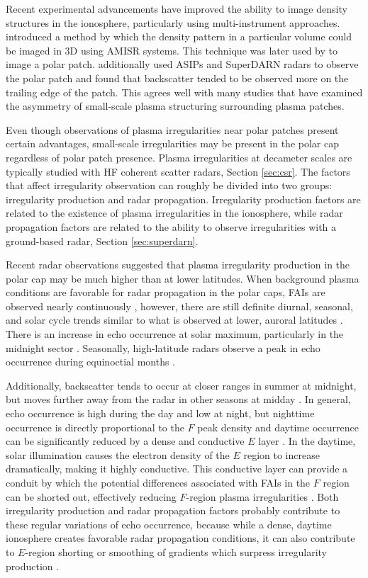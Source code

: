 Recent experimental advancements have improved the ability to image density structures in the ionosphere, particularly using multi-instrument approaches.  \citet{Semeter2009} introduced a method by which the density pattern in a particular volume could be imaged in 3D using AMISR systems.  This technique was later used by \citet{Dahlgren2012a,Dahlgren2012b} to image a polar patch.  \citet{Dahlgren2012b} additionally used ASIPs and SuperDARN radars to observe the polar patch and found that backscatter tended to be observed more on the trailing edge of the patch.  This agrees well with many studies that have examined the asymmetry of small-scale plasma structuring surrounding plasma patches.  

Even though observations of plasma irregularities near polar patches present certain advantages, small-scale irregularities may be present in the polar cap regardless of polar patch presence.  Plasma irregularities at decameter scales are typically studied with HF coherent scatter radars, Section \ref{sec:csr}.  The factors that affect irregularity observation can roughly be divided into two groups: irregularity production and radar propagation.  Irregularity production factors are related to the existence of plasma irregularities in the ionosphere, while radar propagation factors are related to the ability to observe irregularities with a ground-based radar, Section \ref{sec:superdarn}.  

Recent radar observations suggested that plasma irregularity production in the polar cap may be much higher than at lower latitudes.  When background plasma conditions are favorable for radar propagation in the polar caps, FAIs are observed nearly continuously \citep{Bristow2011}, however, there are still definite diurnal, seasonal, and solar cycle trends similar to what is observed at lower, auroral latitudes \citep{Kane2012}.  There is an increase in echo occurrence at solar maximum, particularly in the midnight sector \citep{Milan1997,Koustov2004}.  Seasonally, high-latitude radars observe a peak in echo occurrence during equinoctial months \citep{Koustov2004}.  

Additionally, backscatter tends to occur at closer ranges in summer at midnight, but moves further away from the radar in other seasons at midday \citep{Milan1997}.  In general, echo occurrence is high during the day and low at night, but nighttime occurrence is directly proportional to the \(F\) peak density and daytime occurrence can be significantly reduced by a dense and conductive \(E\) layer \citep{Koustov2004,Kane2012}.  In the daytime, solar illumination causes the electron density of the \(E\) region to increase dramatically, making it highly conductive.  This conductive layer can provide a conduit by which the potential differences associated with FAIs in the \(F\) region can be shorted out, effectively reducing \(F\)-region plasma irregularities \citep{Vickrey1982}.  Both irregularity production and radar propagation factors probably contribute to these regular variations of echo occurrence, because while a dense, daytime ionosphere creates favorable radar propagation conditions, it can also contribute to \(E\)-region shorting or smoothing of gradients which surpress irregularity production \citep{Koustov2004}.  

